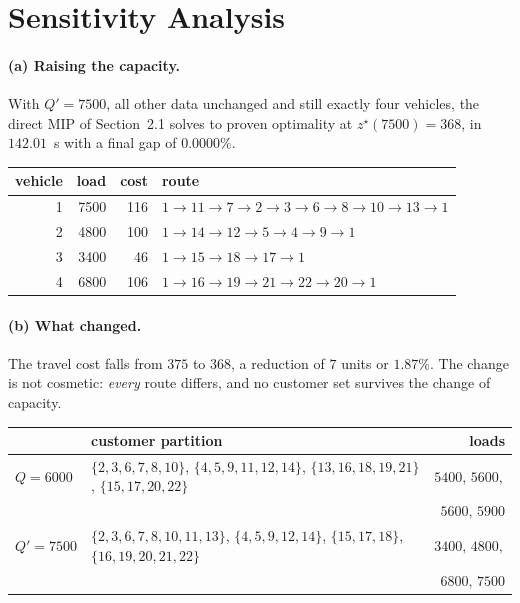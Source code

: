 \documentclass[11pt]{article}
\begin{document}
\section{Sensitivity Analysis}

\paragraph{(a) Raising the capacity.}
With $Q' = 7500$, all other data unchanged and still exactly four
vehicles, the direct MIP of Section~2.1 solves to proven optimality at
$z^\star(7500) = 368$, in $142.01$~s with a final gap of $0.0000\%$.

\begin{center}
\begin{tabular}{@{}rrrl@{}}
\toprule
vehicle & load & cost & route\\
\midrule
1 & 7500 & 116 & $1 \to 11 \to 7 \to 2 \to 3 \to 6 \to 8 \to 10 \to 13 \to 1$\\
2 & 4800 & 100 & $1 \to 14 \to 12 \to 5 \to 4 \to 9 \to 1$\\
3 & 3400 &  46 & $1 \to 15 \to 18 \to 17 \to 1$\\
4 & 6800 & 106 & $1 \to 16 \to 19 \to 21 \to 22 \to 20 \to 1$\\
\bottomrule
\end{tabular}
\end{center}

\paragraph{(b) What changed.}
The travel cost falls from $375$ to $368$, a reduction of $7$ units or
$1.87\%$. The change is not cosmetic: \emph{every} route differs, and
no customer set survives the change of capacity.

\begin{center}\small
\setlength{\tabcolsep}{5pt}
\begin{tabular}{@{}l p{8.6cm} r@{}}
\toprule
& customer partition & loads\\
\midrule
$Q = 6000$ &
  $\{2,3,6,7,8,10\}$, $\{4,5,9,11,12,14\}$, $\{13,16,18,19,21\}$,
  $\{15,17,20,22\}$
  & $5400,\,5600,$\\
& & $5600,\,5900$\\
\addlinespace
$Q' = 7500$ &
  $\{2,3,6,7,8,10,11,13\}$, $\{4,5,9,12,14\}$, $\{15,17,18\}$,
  $\{16,19,20,21,22\}$
  & $3400,\,4800,$\\
& & $6800,\,7500$\\
\bottomrule
\end{tabular}
\end{center}
\end{document}
